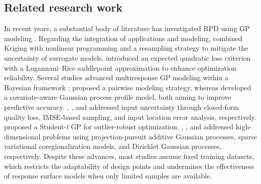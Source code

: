 \documentclass[]{interact}
\theoremstyle{plain}%
\theoremstyle{definition}
\theoremstyle{remark}
\begin{document}
\subsection{Related research work}
In recent years, a substantial body of literature has investigated RPD using GP modeling \citep{Jiang2021}. Regarding the integration of applications and modeling,   \citet{Dellino2012} combined Kriging with nonlinear programming and a resampling strategy to mitigate the uncertainty of surrogate models.   \citet{Tan2012} introduced an expected quadratic loss criterion with a Lugannani–Rice saddlepoint approximation to enhance optimization reliability. Several studies advanced multiresponse GP modeling within a Bayesian framework \citep{Alshraideh2014, Kleijnen2014}; \citet{Li2016} proposed a pairwise modeling strategy, whereas \citet{Ding2024} developed a covariate-aware Gaussian process profile model, both aiming to improve predictive accuracy. \citet{Han2016},   \citet{Wang2019}, and   \citet{Wang2022} addressed input uncertainty through closed-form quality loss, IMSE-based sampling, and input location error analysis, respectively.   \citet{Feng2021} proposed a Student-\emph{t} GP for outlier-robust optimization. \citet{Chen2022},   \citet{Barde2024}, and \citet{Zhou2025} addressed high-dimensional problems using projection-pursuit additive Gaussian processes, sparse variational coregionalization models, and Dirichlet Gaussian processes, respectively. Despite these advances, most studies assume fixed training datasets, which restricts the adaptability of design points and undermines the effectiveness of response surface models when only limited samples are available.
\end{document}
